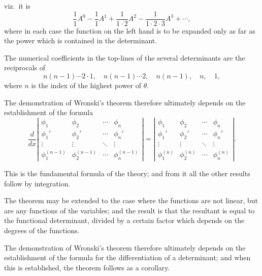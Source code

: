 \documentclass[11pt,a4paper]{article}
\theoremstyle{plain}
\theoremstyle{definition}
\theoremstyle{remark}
\begin{document}
\newpage

viz.\ it is
\[
\frac{1}{1}A^0 - \frac{1}{1}A^1 + \frac{1}{1\cdot 2}A^2 - \frac{1}{1\cdot 2\cdot 3}A^3 + \cdots,
\]
where in each case the function on the left hand is to be expanded only as far as the power which is contained in the determinant.

The numerical coefficients in the top-lines of the several determinants are the reciprocals of
\[
n(n-1)\cdots 2\cdot 1, \quad n(n-1)\cdots 2, \quad n(n-1), \quad n, \quad 1,
\]
where $n$ is the index of the highest power of $\theta$.

\newpage

The demonstration of Wronski's theorem therefore ultimately depends on the establishment of the formula
\[
\frac{d}{dx}\left|\begin{array}{cccc}
\phi_1 & \phi_2 & \cdots & \phi_n \\
\phi_1' & \phi_2' & \cdots & \phi_n' \\
\vdots & \vdots & \ddots & \vdots \\
\phi_1^{(n-1)} & \phi_2^{(n-1)} & \cdots & \phi_n^{(n-1)}
\end{array}\right| = \left|\begin{array}{cccc}
\phi_1 & \phi_2 & \cdots & \phi_n \\
\phi_1' & \phi_2' & \cdots & \phi_n' \\
\vdots & \vdots & \ddots & \vdots \\
\phi_1^{(n)} & \phi_2^{(n)} & \cdots & \phi_n^{(n)}
\end{array}\right|.
\]

This is the fundamental formula of the theory; and from it all the other results follow by integration.

\newpage

The theorem may be extended to the case where the functions are not linear, but are any functions of the variables; and the result is that the resultant is equal to the functional determinant, divided by a certain factor which depends on the degrees of the functions.

The demonstration of Wronski's theorem therefore ultimately depends on the establishment of the formula for the differentiation of a determinant; and when this is established, the theorem follows as a corollary.
\end{document}
